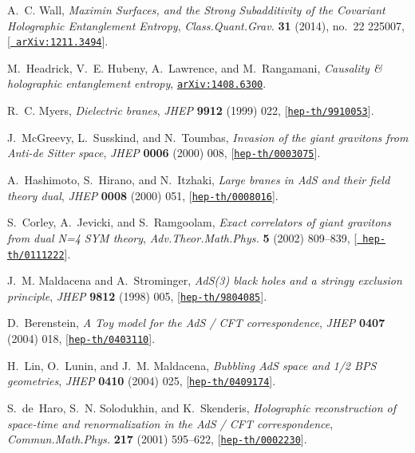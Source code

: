 \documentclass[12pt,a4paper]{article}
\begin{document}
\begin{thebibliography}{100}
A.~C. Wall, {\it {Maximin Surfaces, and the Strong Subadditivity of the
  Covariant Holographic Entanglement Entropy}},  {\em Class.Quant.Grav.} {\bf
  31} (2014), no.~22 225007, [\href{http://xxx.lanl.gov/abs/1211.3494}{{\tt
  arXiv:1211.3494}}].

M.~Headrick, V.~E. Hubeny, A.~Lawrence, and M.~Rangamani, {\it {Causality \&
  holographic entanglement entropy}},
  \href{http://xxx.lanl.gov/abs/1408.6300}{{\tt arXiv:1408.6300}}.

R.~C. Myers, {\it {Dielectric branes}},  {\em JHEP} {\bf 9912} (1999) 022,
  [\href{http://xxx.lanl.gov/abs/hep-th/9910053}{{\tt hep-th/9910053}}].

J.~McGreevy, L.~Susskind, and N.~Toumbas, {\it {Invasion of the giant gravitons
  from Anti-de Sitter space}},  {\em JHEP} {\bf 0006} (2000) 008,
  [\href{http://xxx.lanl.gov/abs/hep-th/0003075}{{\tt hep-th/0003075}}].

A.~Hashimoto, S.~Hirano, and N.~Itzhaki, {\it {Large branes in AdS and their
  field theory dual}},  {\em JHEP} {\bf 0008} (2000) 051,
  [\href{http://xxx.lanl.gov/abs/hep-th/0008016}{{\tt hep-th/0008016}}].

S.~Corley, A.~Jevicki, and S.~Ramgoolam, {\it {Exact correlators of giant
  gravitons from dual N=4 SYM theory}},  {\em Adv.Theor.Math.Phys.} {\bf 5}
  (2002) 809--839, [\href{http://xxx.lanl.gov/abs/hep-th/0111222}{{\tt
  hep-th/0111222}}].

J.~M. Maldacena and A.~Strominger, {\it {AdS(3) black holes and a stringy
  exclusion principle}},  {\em JHEP} {\bf 9812} (1998) 005,
  [\href{http://xxx.lanl.gov/abs/hep-th/9804085}{{\tt hep-th/9804085}}].

D.~Berenstein, {\it {A Toy model for the AdS / CFT correspondence}},  {\em
  JHEP} {\bf 0407} (2004) 018,
  [\href{http://xxx.lanl.gov/abs/hep-th/0403110}{{\tt hep-th/0403110}}].

H.~Lin, O.~Lunin, and J.~M. Maldacena, {\it {Bubbling AdS space and 1/2 BPS
  geometries}},  {\em JHEP} {\bf 0410} (2004) 025,
  [\href{http://xxx.lanl.gov/abs/hep-th/0409174}{{\tt hep-th/0409174}}].

S.~de~Haro, S.~N. Solodukhin, and K.~Skenderis, {\it {Holographic
  reconstruction of space-time and renormalization in the AdS / CFT
  correspondence}},  {\em Commun.Math.Phys.} {\bf 217} (2001) 595--622,
  [\href{http://xxx.lanl.gov/abs/hep-th/0002230}{{\tt hep-th/0002230}}].


\end{thebibliography}
\end{document}
